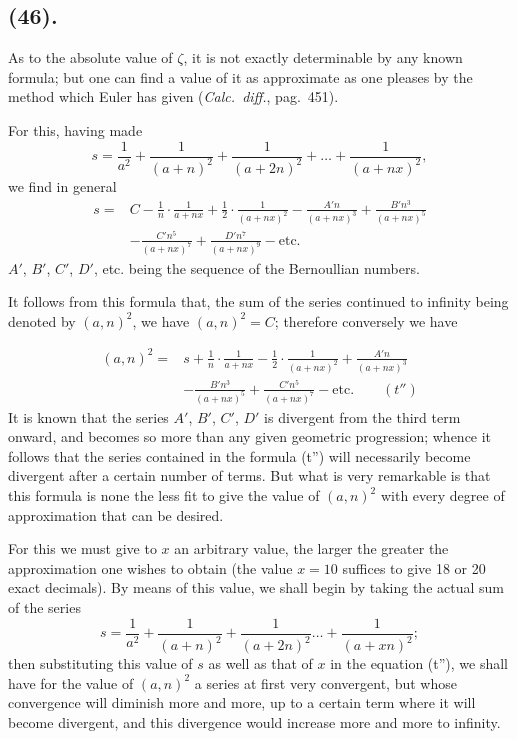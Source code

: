 \documentclass{article}
\begin{document}
\subsection*{(46).}

As to the absolute value of $\zeta$, it is not exactly determinable by any known formula; but one can find a value of it as approximate as one pleases by the method which Euler has given (\emph{Calc.\ diff.}, pag.\ 451).

For this, having made
\[ s=\frac{1}{a^{2}}+\frac{1}{(a+n)^{2}}+\frac{1}{(a+2n)^{2}}+\ldots+\frac{1}{(a+nx)^{2}}, \]
we find in general
\[ \begin{aligned} s={}&C-\frac{1}{n}\cdot\frac{1}{a+nx}+\frac{1}{2}\cdot\frac{1}{(a+nx)^{2}}-\frac{A'n}{(a+nx)^{3}}+\frac{B'n^{3}}{(a+nx)^{5}}\\ &-\frac{C'n^{5}}{(a+nx)^{7}}+\frac{D'n^{7}}{(a+nx)^{9}}-\text{etc.} \end{aligned} \]
$A'$, $B'$, $C'$, $D'$, etc. being the sequence of the Bernoullian numbers.

It follows from this formula that, the sum of the series continued to infinity being denoted by $(a,n)^{2}$, we have $(a,n)^{2}=C$; therefore conversely we have

\[ \begin{aligned} (a,n)^{2}={}&s+\frac{1}{n}\cdot\frac{1}{a+nx}-\frac{1}{2}\cdot\frac{1}{(a+nx)^{2}}+\frac{A'n}{(a+nx)^{3}}\\ &-\frac{B'n^{3}}{(a+nx)^{5}}+\frac{C'n^{5}}{(a+nx)^{7}}-\text{etc.}\qquad(t'') \end{aligned} \]
It is known that the series $A'$, $B'$, $C'$, $D'$ is divergent from the third term onward, and becomes so more than any given geometric progression; whence it follows that the series contained in the formula (t'') will necessarily become divergent after a certain number of terms. But what is very remarkable is that this formula is none the less fit to give the value of $(a,n)^{2}$ with every degree of approximation that can be desired.

For this we must give to $x$ an arbitrary value, the larger the greater the approximation one wishes to obtain (the value $x=10$ suffices to give 18 or 20 exact decimals). By means of this value, we shall begin by taking the actual sum of the series
\[ s=\frac{1}{a^{2}}+\frac{1}{(a+n)^{2}}+\frac{1}{(a+2n)^{2}}\ldots+\frac{1}{(a+xn)^{2}}; \]
then substituting this value of $s$ as well as that of $x$ in the equation (t''), we shall have for the value of $(a,n)^{2}$ a series at first very convergent, but whose convergence will diminish more and more, up to a certain term where it will become divergent, and this divergence would increase more and more to infinity.
\end{document}
